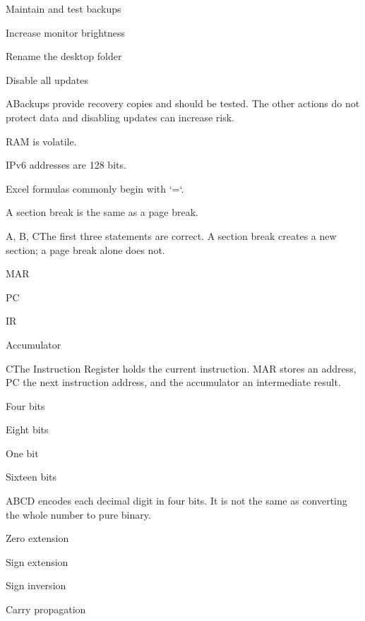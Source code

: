 \begin{enumerate}[label=\textbf{Q\arabic*.}, leftmargin=*]
  {\item Maintain and test backups
   \item Increase monitor brightness
   \item Rename the desktop folder
   \item Disable all updates}
  {A}{Backups provide recovery copies and should be tested. The other actions do not protect data and disabling updates can increase risk.}
  {\item RAM is volatile.
   \item IPv6 addresses are 128 bits.
   \item Excel formulas commonly begin with `=`.
   \item A section break is the same as a page break.}
  {A, B, C}{The first three statements are correct. A section break creates a new section; a page break alone does not.}
\fi
\ifnum{}
  {\item MAR
   \item PC
   \item IR
   \item Accumulator}
  {C}{The Instruction Register holds the current instruction. MAR stores an address, PC the next instruction address, and the accumulator an intermediate result.}
  {\item Four bits
   \item Eight bits
   \item One bit
   \item Sixteen bits}
  {A}{BCD encodes each decimal digit in four bits. It is not the same as converting the whole number to pure binary.}
  {\item Zero extension
   \item Sign extension
   \item Sign inversion
   \item Carry propagation}

\end{enumerate}
